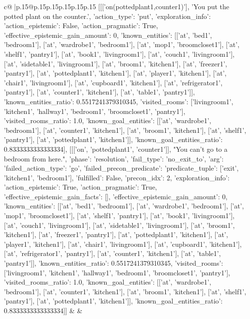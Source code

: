 \documentclass{article}
\begin{document}
{\begin{supertabular}{c@{$\;$}|p{.15\linewidth}@{}p{.15\linewidth}p{.15\linewidth}p{.15\linewidth}p{.15\linewidth}p{.15\linewidth}}
{{{	 [[['on(pottedplant1,counter1)'], 'You put the potted plant on the counter.', {'action_type': 'put', 'exploration_info': {'action_epistemic': False, 'action_pragmatic': True, 'effective_epistemic_gain_amount': 0, 'known_entities': [['at', 'bed1', 'bedroom1'], ['at', 'wardrobe1', 'bedroom1'], ['at', 'mop1', 'broomcloset1'], ['at', 'shelf1', 'pantry1'], ['at', 'book1', 'livingroom1'], ['at', 'couch1', 'livingroom1'], ['at', 'sidetable1', 'livingroom1'], ['at', 'broom1', 'kitchen1'], ['at', 'freezer1', 'pantry1'], ['at', 'pottedplant1', 'kitchen1'], ['at', 'player1', 'kitchen1'], ['at', 'chair1', 'livingroom1'], ['at', 'cupboard1', 'kitchen1'], ['at', 'refrigerator1', 'pantry1'], ['at', 'counter1', 'kitchen1'], ['at', 'table1', 'pantry1']], 'known_entities_ratio': 0.5517241379310345, 'visited_rooms': ['livingroom1', 'kitchen1', 'hallway1', 'bedroom1', 'broomcloset1', 'pantry1'], 'visited_rooms_ratio': 1.0, 'known_goal_entities': [['at', 'wardrobe1', 'bedroom1'], ['at', 'counter1', 'kitchen1'], ['at', 'broom1', 'kitchen1'], ['at', 'shelf1', 'pantry1'], ['at', 'pottedplant1', 'kitchen1']], 'known_goal_entities_ratio': 0.8333333333333334}}], [[['on', 'pottedplant1', 'counter1']], "You can't go to a bedroom from here.", {'phase': 'resolution', 'fail_type': 'no_exit_to', 'arg': {'failed_action_type': 'go', 'failed_precon_predicate': {'predicate_tuple': ['exit', 'kitchen1', 'bedroom1'], 'fulfilled': False, 'precon_idx': 2}}, 'exploration_info': {'action_epistemic': True, 'action_pragmatic': True, 'effective_epistemic_gain_facts': [], 'effective_epistemic_gain_amount': 0, 'known_entities': [['at', 'bed1', 'bedroom1'], ['at', 'wardrobe1', 'bedroom1'], ['at', 'mop1', 'broomcloset1'], ['at', 'shelf1', 'pantry1'], ['at', 'book1', 'livingroom1'], ['at', 'couch1', 'livingroom1'], ['at', 'sidetable1', 'livingroom1'], ['at', 'broom1', 'kitchen1'], ['at', 'freezer1', 'pantry1'], ['at', 'pottedplant1', 'kitchen1'], ['at', 'player1', 'kitchen1'], ['at', 'chair1', 'livingroom1'], ['at', 'cupboard1', 'kitchen1'], ['at', 'refrigerator1', 'pantry1'], ['at', 'counter1', 'kitchen1'], ['at', 'table1', 'pantry1']], 'known_entities_ratio': 0.5517241379310345, 'visited_rooms': ['livingroom1', 'kitchen1', 'hallway1', 'bedroom1', 'broomcloset1', 'pantry1'], 'visited_rooms_ratio': 1.0, 'known_goal_entities': [['at', 'wardrobe1', 'bedroom1'], ['at', 'counter1', 'kitchen1'], ['at', 'broom1', 'kitchen1'], ['at', 'shelf1', 'pantry1'], ['at', 'pottedplant1', 'kitchen1']], 'known_goal_entities_ratio': 0.8333333333333334}}]] 
	  } 
	   } 
	   } 
	 & & \\ 
 


\end{supertabular}}
\end{document}

